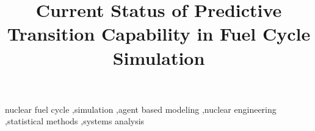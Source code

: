 \documentclass[3p,onecolumn]{elsarticle}
\begin{document}
\begin{frontmatter}

        \title{Current Status of Predictive Transition Capability in Fuel Cycle Simulation}







\begin{keyword}
nuclear fuel cycle \sep simulation \sep agent based modeling \sep nuclear 
        engineering \sep statistical methods \sep systems analysis
\end{keyword}

\end{frontmatter}








\nocite{*}

\end{document}
